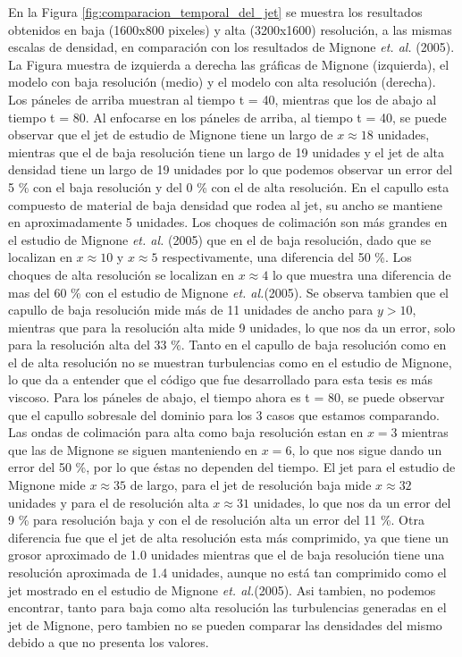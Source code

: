 \documentclass[12pt,a4paper]{book}
\begin{document}
En la Figura \ref{fig:comparacion_temporal_del_jet} se muestra los resultados obtenidos en baja 
(1600x800 pixeles) y alta (3200x1600) resolución, a 
las mismas escalas de densidad, en comparación con los resultados de Mignone \emph{et. al.} (2005).
La Figura muestra de izquierda a derecha las gráficas de Mignone (izquierda), el modelo con baja resolución 
(medio) y el modelo con alta resolución (derecha). Los páneles de arriba muestran al tiempo t = 40, mientras que los 
de abajo al tiempo t = 80.
Al enfocarse en los páneles de arriba, al tiempo t = 40, se puede observar que el jet de estudio de Mignone tiene un largo 
de $x \approx 18$ unidades, mientras que el de baja resolución tiene un largo de 19 unidades y 
el jet de alta densidad  tiene un largo de 19 unidades por lo que podemos observar un error del 5 \% 
con el baja resolución y del 0 \% con el de alta resolución. En el capullo esta compuesto de material de baja densidad 
que rodea al jet, su ancho se mantiene en aproximadamente 5 unidades.
Los choques de colimación son más grandes en el estudio de Mignone \emph{et. al.} (2005)
que en el de baja resolución, 
dado que se localizan en $x \approx 10$ y $x \approx 5$ respectivamente, una diferencia del 50 \%. 
Los choques de alta resolución se localizan en $x \approx 4$  lo que muestra una diferencia de mas del 
60 \% con el estudio de Mignone \emph{et. al.}(2005).
Se observa tambien que el capullo de baja resolución mide más de 11 unidades de ancho para $y > 10$, 
mientras que para la resolución alta mide 9 unidades, lo que nos da un error, solo para la resolución alta del 33 \%.
Tanto en el capullo de baja resolución como en el de alta resolución no se muestran turbulencias 
como en el estudio de Mignone, lo que da a entender  que el código que fue desarrollado para esta tesis 
es más viscoso.
Para los páneles de abajo, el tiempo ahora es t = 80, se puede observar que el capullo sobresale del dominio para los 
3 casos que estamos comparando. Las ondas de colimación para alta como baja resolución
estan en $x = 3$ mientras que las de Mignone se siguen manteniendo en $x = 6$, lo que nos sigue dando un error 
del 50 \%, por lo que éstas no dependen del tiempo. 
El jet para el estudio de Mignone mide $x \approx 35$ de largo, para el jet de resolución baja mide $x \approx 32$ unidades y 
para el de resolución alta $x \approx 31$ unidades, lo que nos da un error del 9 \% para resolución baja y con el 
de resolución alta un error del 11 \%.
Otra diferencia fue que el jet de 
alta resolución esta más comprimido, ya que tiene un grosor aproximado de 1.0 unidades 
mientras que el de baja resolución tiene una resolución aproximada de 1.4 unidades, 
aunque no está tan comprimido como el jet mostrado en el estudio de Mignone \emph{et. al.}(2005). Asi tambien, no podemos encontrar, tanto para baja como 
alta resolución las turbulencias generadas en el jet de Mignone, pero tambien no se pueden comparar las densidades del 
mismo debido a que no presenta los valores.
\end{document}
